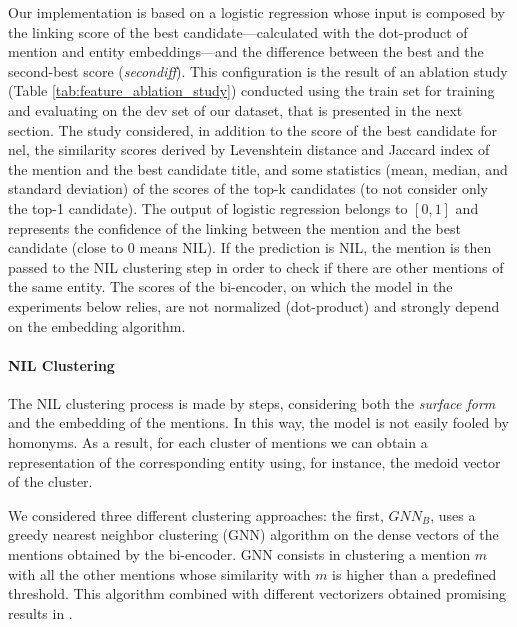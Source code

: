 Our implementation is based on a logistic regression whose input is composed by %
the linking score of the best candidate---calculated with the dot-product of mention and entity embeddings---and the difference between the best and the second-best score (\textit{secondiff}).
This configuration is the result of an ablation study (Table \ref{tab:feature_ablation_study}) conducted using the train set for training and evaluating on the dev set of our dataset, that is presented in the next section. The study considered, in addition to the score of the best candidate for \ac{nel}, the similarity scores derived by Levenshtein distance and Jaccard index of the mention and the best candidate title, and some statistics (mean, median, and standard deviation) of the scores of the top-k candidates (to not consider only the top-1 candidate).
The output of logistic regression belongs to $[0,1]$ and represents the confidence of the linking between the mention and the best candidate (close to 0 means NIL).
If the prediction is NIL, the mention is then passed to the NIL clustering step in order to check if there are other mentions of the same entity.
The scores of the bi-encoder, on which the model in the experiments below relies, are not normalized (dot-product) and strongly depend on the embedding algorithm.


\paragraph{NIL Clustering}
The NIL clustering process is made by steps, considering both the \textit{surface form} and the embedding of the mentions.
In this way, the model is not easily fooled by homonyms.
As a result, for each cluster of mentions we can obtain a representation of the corresponding entity using, for instance, the medoid vector of the cluster.

We considered three different clustering approaches:
the first, $GNN_B$, uses a greedy nearest neighbor clustering (GNN) algorithm on the dense vectors of the mentions obtained by the bi-encoder. GNN consists in clustering a mention $m$ with all the other mentions whose similarity with $m$ is higher than a predefined threshold. This algorithm combined with different vectorizers obtained promising results in \cite{streaming_crossdoc_coreference}.

